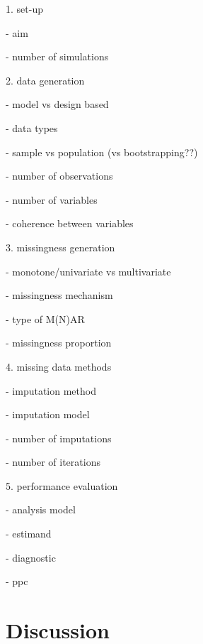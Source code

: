\documentclass[bimj,fleqn]{w-art}
\theoremstyle{plain}
\theoremstyle{definition}
\begin{document}
1. set-up

- aim

- number of simulations

2. data generation

- model vs design based

- data types

- sample vs population (vs bootstrapping??)

- number of observations

- number of variables

- coherence between variables


3. missingness generation

- monotone/univariate vs multivariate

- missingness mechanism

- type of M(N)AR

- missingness proportion 

4. missing data methods

- imputation method

- imputation model

- number of imputations

- number of iterations

5. performance evaluation

- analysis model

- estimand

- diagnostic

- ppc



\section{Discussion}


\begin{acknowledgement}
\end{acknowledgement}
\vspace*{1pc}



% 
% 
\end{document}
